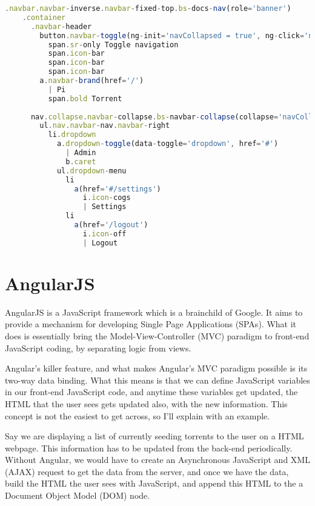 \vspace{20px}
\begin{lstlisting}[caption=Some Jade markup, language=JavaScript]
  .navbar.navbar-inverse.navbar-fixed-top.bs-docs-nav(role='banner')
    .container
      .navbar-header
        button.navbar-toggle(ng-init='navCollapsed = true', ng-click='navCollapsed = !navCollapsed')
          span.sr-only Toggle navigation
          span.icon-bar
          span.icon-bar
          span.icon-bar
        a.navbar-brand(href='/')
          | Pi
          span.bold Torrent
  
      nav.collapse.navbar-collapse.bs-navbar-collapse(collapse='navCollapsed')
        ul.nav.navbar-nav.navbar-right
          li.dropdown
            a.dropdown-toggle(data-toggle='dropdown', href='#')
              | Admin
              b.caret
            ul.dropdown-menu
              li
                a(href='#/settings')
                  i.icon-cogs
                  | Settings
              li
                a(href='/logout')
                  i.icon-off
                  | Logout
\end{lstlisting}


\section{AngularJS}
AngularJS\cite{AngularJS} is a JavaScript framework which is a brainchild of Google. It aims to provide a mechanism for developing Single Page Applications (SPAs). What it does is essentially bring the Model-View-Controller (MVC) paradigm to front-end JavaScript coding, by separating logic from views.

Angular's killer feature, and what makes Angular's MVC paradigm possible is its two-way data binding. What this means is that we can define JavaScript variables in our front-end JavaScript code, and anytime these variables get updated, the HTML that the user sees gets updated also, with the new information. This concept is not the easiest to get across, so I'll explain with an example.

Say we are displaying a list of currently seeding torrents to the user on a HTML webpage. This information has to be updated from the back-end periodically. Without Angular, we would have to create an Asynchronous JavaScript and XML (AJAX) request to get the data from the server, and once we have the data, build the HTML the user sees with JavaScript, and append this HTML to the a Document Object Model (DOM) node.

